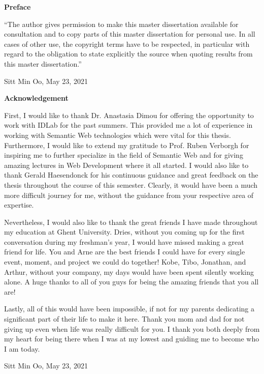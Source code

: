 
\newpage
{}
{}
\noindent \textbf{\huge Preface}

\vspace{1.5cm}

\noindent
``The author gives permission to make this master dissertation available for consultation and to copy parts
of this master dissertation for personal use. In all cases of other use, the copyright terms have to be respected,
in particular with regard to the obligation to state explicitly the source when quoting results from this master
dissertation.''

\vspace{1cm}

\noindent Sitt Min Oo, May 23, 2021 


\newpage
{}
{}
\noindent \textbf{\huge Acknowledgement}

\vspace{1.5cm}
First, I would like to thank Dr. Anastasia Dimou for offering the opportunity to 
work with IDLab for the past summers. This provided me a lot of experience 
in working with Semantic Web technologies which were vital for this 
thesis. Furthermore, I would like to extend my gratitude to Prof. Ruben Verborgh 
for inspiring me to further specialize in the field of Semantic Web and for giving amazing 
lectures in Web Development where it all started. I would also like to thank Gerald Haesendonck for 
his continuous guidance and great feedback on the thesis throughout the course of this semester. 
Clearly, it would have been a much more difficult journey for me, without the guidance from your 
respective area of expertise.

Nevertheless, I would also like to thank the great friends I have made throughout my education 
at Ghent University. Dries, without you coming up for the first conversation during my freshman's year, I would 
have missed making a great friend for life. You and Arne are the best friends I could have for every single 
event, moment, and project we could do together! Kobe, Tibo, Jonathan, and Arthur, without your company,  
my days would have been spent silently working alone. 
A huge thanks to all of you guys for being the amazing friends that you all are!  

Lastly, all of this would have been impossible, if not for my parents dedicating a significant part of 
their life to make it here. Thank you mom and dad for not giving up even when life was really difficult 
for you. 
I thank you both deeply from my heart for being there when I was at my lowest and guiding me to become 
who I am today. 

\vspace{1cm}
\noindent Sitt Min Oo, May 23, 2021 
